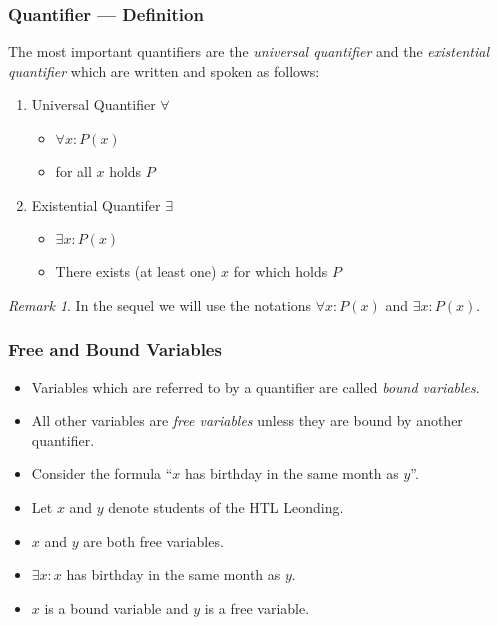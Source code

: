\documentclass{beamer}
\theoremstyle{remark}
\newtheorem{remark}[theorem]{Remark}
\begin{document}
\begin{frame}
\frametitle{Quantifier --- Definition}
\begin{definition}
The most important quantifiers are the {\em universal quantifier} and the {\em existential quantifier} which are written and spoken as follows:
\begin{enumerate}
	\item Universal Quantifier $\forall$
	\begin{itemize}
		\item $\forall x: P(x)$
		\pause
		\item for all $x$ holds $P$
	\end{itemize}
	\pause
	\item Existential Quantifer $\exists$
		\begin{itemize}
			\item $\exists x: P(x)$
			\pause
			\item There exists (at least one) $x$ for which holds $P$
		\end{itemize}
\end{enumerate}
\end{definition}

\pause

\begin{remark}
In the sequel we will use the notations $\forall x: P(x)$ and $\exists x: P(x)$.
\end{remark}
\end{frame}

\begin{frame}
\frametitle{Free and Bound Variables}
\begin{itemize}
	\item Variables which are referred to by a quantifier are called {\em bound variables}.
	\item All other variables are {\em free variables} unless they are bound by another quantifier.
\end{itemize}

\pause
\begin{example}
\begin{itemize}
	\item Consider the formula ``$x$ has birthday in the same month as $y$''.
	\item Let $x$ and $y$ denote students of the HTL Leonding.
	\item $x$ and $y$ are both free variables.
	\pause
	\item $\exists x: x$ has birthday in the same month as $y$.
	\item $x$ is a bound variable and $y$ is a free variable.
\end{itemize}
\end{example}
\end{frame}
\end{document}
